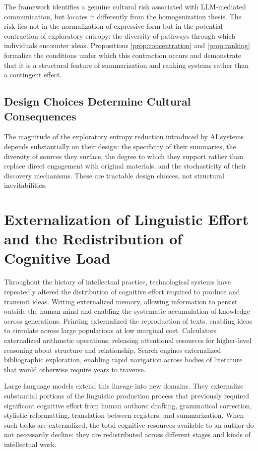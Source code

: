\documentclass[12pt,a4paper]{article}
\theoremstyle{definition}
\theoremstyle{plain}
\theoremstyle{remark}
\begin{document}
The framework identifies a genuine cultural risk associated with LLM-mediated communication,
but locates it differently from the homogenization thesis. The risk lies not in the
normalization of expressive form but in the potential contraction of exploratory entropy:
the diversity of pathways through which individuals encounter ideas. Propositions
\ref{prop:concentration} and \ref{prop:ranking} formalize the conditions under which this
contraction occurs and demonstrate that it is a structural feature of summarization and
ranking systems rather than a contingent effect.

\subsection{Design Choices Determine Cultural Consequences}

The magnitude of the exploratory entropy reduction introduced by AI systems depends
substantially on their design: the specificity of their summaries, the diversity of sources
they surface, the degree to which they support rather than replace direct engagement with
original materials, and the stochasticity of their discovery mechanisms. These are tractable
design choices, not structural inevitabilities.

\section{Externalization of Linguistic Effort and the Redistribution of Cognitive Load}
\label{sec:externalization}

Throughout the history of intellectual practice, technological systems have repeatedly
altered the distribution of cognitive effort required to produce and transmit ideas. Writing
externalized memory, allowing information to persist outside the human mind and enabling the
systematic accumulation of knowledge across generations. Printing externalized the
reproduction of texts, enabling ideas to circulate across large populations at low
marginal cost. Calculators externalized arithmetic operations, releasing attentional
resources for higher-level reasoning about structure and relationship. Search engines
externalized bibliographic exploration, enabling rapid navigation across bodies of literature
that would otherwise require years to traverse.

Large language models extend this lineage into new domains. They externalize substantial
portions of the linguistic production process that previously required significant cognitive
effort from human authors: drafting, grammatical correction, stylistic reformatting,
translation between registers, and summarization. When such tasks are externalized, the
total cognitive resources available to an author do not necessarily decline; they are
redistributed across different stages and kinds of intellectual work.
\end{document}
